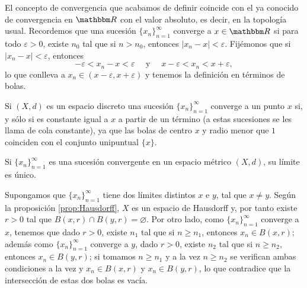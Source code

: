 \begin{examplebox}{}{}
    El concepto de convergencia que acabamos de definir coincide con el ya conocido de convergencia en $\RR$ con el valor absoluto, es decir, en la topología usual. Recordemos que una sucesión $\{x_n\}_{n = 1}^{\infty}$ converge a $x \in \RR$ si para todo $\varepsilon > 0$, existe $n_0$ tal que si $n > n_0$, entonces $|x_n - x| < \varepsilon$. Fijémonos que si $|x_n - x| < \varepsilon$, entonces
    $$-\varepsilon < x_n - x < \varepsilon \quad \text{ y } \quad x - \varepsilon < x_n < x + \varepsilon,$$
    lo que conlleva a $x_n \in (x - \varepsilon, x + \varepsilon)$ y tenemos la definición en términos de bolas.
\end{examplebox}

\begin{examplebox}{}{}
    Si $(X, d)$ es un espacio discreto una sucesión $\{x_n\}_{n = 1}^{\infty}$ converge a un punto $x$ si, y sólo si es constante igual a $x$ a partir de un término (a estas sucesiones se les llama de cola constante), ya que las bolas de centro $x$ y radio menor que $1$ coinciden con el conjunto unipuntual $\{x\}$.
\end{examplebox}

\begin{theorem}{}{}
    Si $\{x_n\}_{n = 1}^{\infty}$ es una sucesión convergente en un espacio métrico $(X, d)$, su límite es único.

    \tcblower
    \demostracion Supongamos que $\{x_n\}_{n = 1}^{\infty}$ tiene dos límites distintos $x$ e $y$, tal que $x \neq y$. Según la proposición \ref{prop:Hausdorff}, $X$ es un espacio de Hausdorff y, por tanto existe $r > 0$ tal que $B(x, r) \cap B(y, r) = \varnothing$. Por otro lado, como $\{x_n\}_{n = 1}^{\infty}$ converge a $x$, tenemos que dado $r > 0$, existe $n_1$ tal que si $n \geq n_1$, entonces $x_n \in B(x, r)$; además como $\{x_n\}_{n = 1}^{\infty}$ converge a $y$, dado $r > 0$, existe $n_2$ tal que si $n \geq n_2$, entonces $x_n \in B(y, r)$; si tomamos $n \geq n_1$ y a la vez $n \geq n_2$ se verifican ambas condiciones a la vez y $x_n \in B(x, r)$ y $x_n \in B(y, r)$, lo que contradice que la intersección de estas dos bolas es vacía.
\end{theorem}


